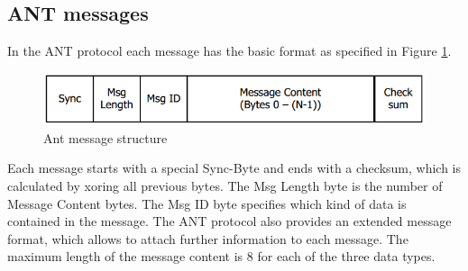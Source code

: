 \subsection{ANT messages}
In the ANT protocol each message has the basic format as specified in Figure \ref{fig:antmsg}.
\begin{figure}[h]
	\centering
	\includegraphics[scale=.75]{./pics/ANTmsg.png}
	\caption{Ant message structure\cite{DynastreamInnovationsInc.2013}}\label{fig:antmsg}
\end{figure}
Each message starts with a special Sync-Byte and ends with a checksum, which is calculated by xoring all previous bytes. The Msg Length byte is the number of Message Content bytes. The Msg ID byte specifies which kind of data is contained in the message. The ANT protocol also provides an extended message format, which allows to attach further information to each message. The maximum length of the message content is 8 for each of the three data types.

